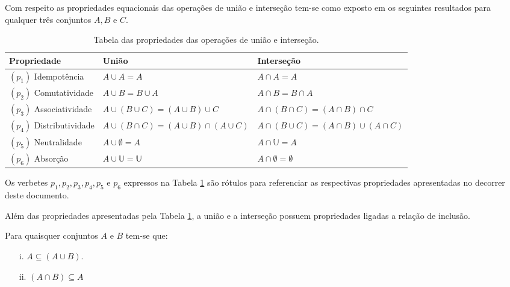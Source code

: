 Com respeito as propriedades equacionais das operações de união e interseção tem-se como exposto em \cite{lipschutz2013-MD} os seguintes resultados para qualquer três conjuntos $A, B$ e $C$.

\begin{table}[h]
	\centering
	\scriptsize
	\begin{tabular}{lll}
		\hline
		Propriedade & União & Interseção\\
		\hline
    $(p_1)$ Idempotência &  $A \cup A = A$ & $A \cap A = A$\\
		$(p_2)$ Comutatividade & $A \cup B = B \cup A$ & $A \cap B = B \cap A$\\
		$(p_3)$ Associatividade & $A \cup (B \cup C) = (A \cup B) \cup C$ & $A \cap (B \cap C) = (A \cap B) \cap C$\\
		$(p_4)$ Distributividade & $A \cup (B \cap C) = (A \cup B) \cap (A \cup C)$ & $A \cap (B \cup C) = (A \cap B) \cup (A \cap C)$\\
		$(p_5)$ Neutralidade &  $A \cup \emptyset = A$ & $A \cap \mathbb{U} = A$\\
		$(p_6)$ Absorção & $A \cup \mathbb{U} = \mathbb{U}$ & $A \cap \emptyset = \emptyset$\\
		\hline
	\end{tabular}
	\caption{Tabela das propriedades das operações de união e interseção.}
	\label{tab:PropriedadesUniaoIntersecao}
\end{table}

\begin{dica}\label{tips:Apelidos}
  Os verbetes $p_1, p_2, p_3, p_4, p_5$ e $p_6$ expressos na Tabela \ref{tab:PropriedadesUniaoIntersecao} são rótulos para referenciar as respectivas propriedades apresentadas no decorrer deste documento.
\end{dica}

Além das propriedades apresentadas pela Tabela \ref{tab:PropriedadesUniaoIntersecao}, a união e a interseção possuem propriedades ligadas a relação de inclusão.

\begin{teorema}\label{teo:MonotonicidadeDaUniaoIntersecao}
	Para quaisquer conjuntos $A$ e $B$ tem-se que:
	\begin{itemize}
		\item[i.] $A \subseteq (A \cup B)$.
		\item[ii.] $(A \cap B) \subseteq A$
	\end{itemize}
\end{teorema}

